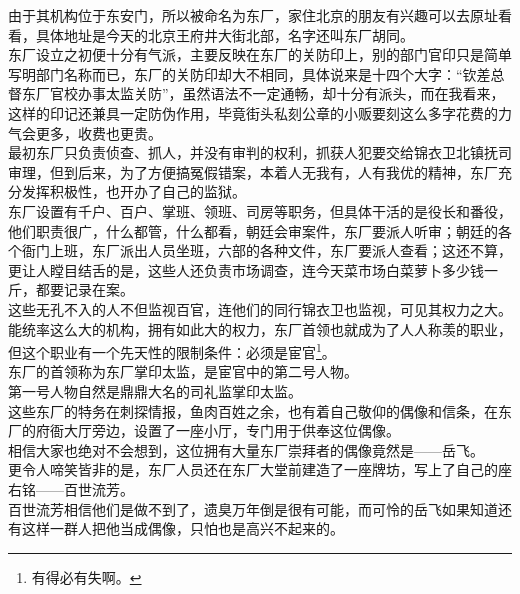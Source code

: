 \begin{multicols}{\theparacolNo}
由于其机构位于东安门，所以被命名为东厂，家住北京的朋友有兴趣可以去原址看看，具体地址是今天的北京王府井大街北部，名字还叫东厂胡同。\\

东厂设立之初便十分有气派，主要反映在东厂的关防印上，别的部门官印只是简单写明部门名称而已，东厂的关防印却大不相同，具体说来是十四个大字：“钦差总督东厂官校办事太监关防”，虽然语法不一定通畅，却十分有派头，而在我看来，这样的印记还兼具一定防伪作用，毕竟街头私刻公章的小贩要刻这么多字花费的力气会更多，收费也更贵。\\

最初东厂只负责侦查、抓人，并没有审判的权利，抓获人犯要交给锦衣卫北镇抚司审理，但到后来，为了方便搞冤假错案，本着人无我有，人有我优的精神，东厂充分发挥积极性，也开办了自己的监狱。\\

东厂设置有千户、百户、掌班、领班、司房等职务，但具体干活的是役长和番役，他们职责很广，什么都管，什么都看，朝廷会审案件，东厂要派人听审；朝廷的各个衙门上班，东厂派出人员坐班，六部的各种文件，东厂要派人查看；这还不算，更让人瞠目结舌的是，这些人还负责市场调查，连今天菜市场白菜萝卜多少钱一斤，都要记录在案。\\

这些无孔不入的人不但监视百官，连他们的同行锦衣卫也监视，可见其权力之大。\\

能统率这么大的机构，拥有如此大的权力，东厂首领也就成为了人人称羡的职业，但这个职业有一个先天性的限制条件：必须是宦官\footnote{有得必有失啊。}。\\

东厂的首领称为东厂掌印太监，是宦官中的第二号人物。\\

第一号人物自然是鼎鼎大名的司礼监掌印太监。\\

这些东厂的特务在刺探情报，鱼肉百姓之余，也有着自己敬仰的偶像和信条，在东厂的府衙大厅旁边，设置了一座小厅，专门用于供奉这位偶像。\\

相信大家也绝对不会想到，这位拥有大量东厂崇拜者的偶像竟然是——岳飞。\\

更令人啼笑皆非的是，东厂人员还在东厂大堂前建造了一座牌坊，写上了自己的座右铭——百世流芳。\\

百世流芳相信他们是做不到了，遗臭万年倒是很有可能，而可怜的岳飞如果知道还有这样一群人把他当成偶像，只怕也是高兴不起来的。\\


\end{multicols}
